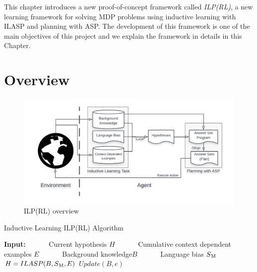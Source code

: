 This chapter introduces a new proof-of-concept framework called \textit{ILP(RL)}, a new learning framework for solving MDP problems using inductive learning with ILASP and planning with ASP.
The development of this framework is one of the main objectives of this project and we explain the framework in details in this Chapter.

\section{Overview}
\label{sec:overview}

\begin{figure}[!htb]
\centering
\includegraphics[width=1.0\textwidth]{./figures/architecture}
\caption{ILP(RL) overview}
\label{fig:ILPRL_overview}
\end{figure}


\begin{algorithm}
\caption{Inductive Learning ILP(RL) Algorithm}
\begin{algorithmic}[1]
\label{algo:ILPRL}
\renewcommand{\algorithmicrequire}{\textbf{Input:}}
\State \textbf{Input:}
\State \ \ \ \ \ \ Current hypothesis $H$
\State \ \ \ \ \ \ Cumulative context dependent examples $E$
\State \ \ \ \ \ \ Background knowledge$B$
\State \ \ \ \ \ \ Language bias $S\textsubscript{M}$ \\
\State $H = ILASP(B, S\textsubscript{M}, E)$
\EndIf
\State $Update(B, e)$

\EndProcedure
\end{algorithmic}
\end{algorithm}



